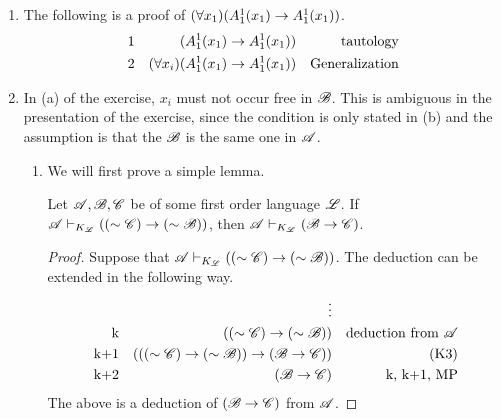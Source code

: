 \begin{enumerate}
  \item %
    The following is a proof of \((\forall x_1) (A^1_1(x_1) \rightarrow A^1_1(x_1))\).
    \begin{align*}
      \text{1}&&
      (A^1_1(x_1) \rightarrow A^1_1(x_1))&&
      \text{tautology}\\
      \text{2}&&
      (\forall x_i)(A^1_1(x_1) \rightarrow A^1_1(x_1))&&
      \text{Generalization}
    \end{align*}

  \item %
    In (a) of the exercise, \(x_i\) must not occur free in \(\mathscr{B}\). This is ambiguous in the presentation of the exercise, since the condition is only stated in (b) and the assumption is that the \wf{} \(\mathscr{B}\) is the same one in \(\mathscr{A}\).

    \begin{enumerate}
      \item We will first prove a simple lemma.
        \begin{lemma*}
          Let \(\mathscr{A}, \mathscr{B}, \mathscr{C}\) be \wfs{} of some first order language \(\mathscr{L}\). If \(\mathscr{A} \vdash_{K_{\mathscr{L}}} ((\sim\mathscr{C}) \rightarrow (\sim\mathscr{B}))\), then \(\mathscr{A} \vdash_{K_{\mathscr{L}}} (\mathscr{B} \rightarrow \mathscr{C})\).

          \begin{proof}
            Suppose that \(\mathscr{A} \vdash_{K_{\mathscr{L}}} ((\sim\mathscr{C}) \rightarrow (\sim\mathscr{B}))\). The deduction can be extended in the following way.
            \begin{align*}
              &&
              \vdots&&
              \\
              \text{k}&&
              ((\sim\mathscr{C}) \rightarrow (\sim\mathscr{B}))&&
              \text{deduction from \(\ensuremath\mathscr{A}\)}\\
              \text{k+1}&&
              (((\sim\mathscr{C}) \rightarrow (\sim\mathscr{B})) \rightarrow (\mathscr{B} \rightarrow \mathscr{C}))&&
              \text{(K3)}\\
              \text{k+2}&&
              (\mathscr{B} \rightarrow \mathscr{C})&&
              \text{k, k+1, MP}
            \end{align*}
            The above is a deduction of \((\mathscr{B} \rightarrow \mathscr{C})\) from \(\mathscr{A}\).
          \end{proof}
        \end{lemma*}


\end{enumerate}
\end{enumerate}
